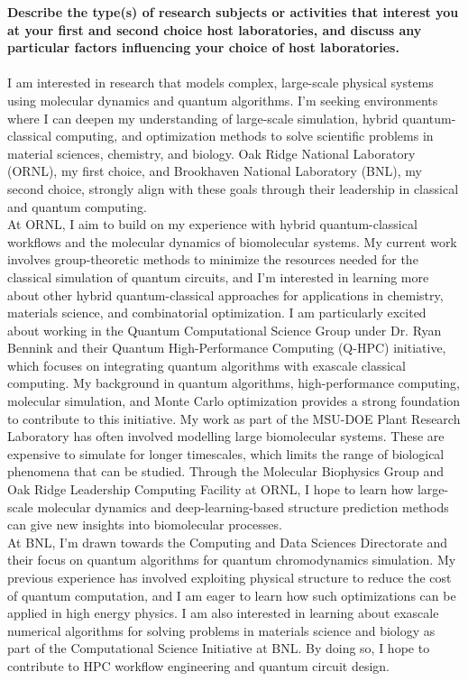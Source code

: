 \documentclass{article}
\begin{document}
\noindent\textbf{Describe the type(s) of research subjects or activities that interest you at your first and second choice host laboratories, and discuss any particular factors influencing your choice of host laboratories.}
\\\\

I am interested in research that models complex, large-scale physical systems using molecular dynamics
and quantum algorithms. I’m seeking environments where I can deepen my understanding of large-scale
simulation, hybrid quantum-classical computing, and optimization methods to solve scientific problems in
material sciences, chemistry, and biology. Oak Ridge National Laboratory (ORNL), my first choice, and Brookhaven National Laboratory (BNL), my second choice, strongly align with these goals through their leadership in classical and quantum computing.
\\

At ORNL, I aim to build on my experience with hybrid quantum-classical workflows and the molecular
dynamics of biomolecular systems. My current work involves group-theoretic methods to minimize the
resources needed for the classical simulation of quantum circuits, and I’m interested in learning more about
other hybrid quantum-classical approaches for applications in chemistry, materials science, and combinatorial
optimization. I am particularly excited about working in the Quantum Computational Science Group under Dr. Ryan
Bennink and their Quantum High-Performance Computing (Q-HPC) initiative, which focuses on integrating
quantum algorithms with exascale classical computing. My background in quantum algorithms, high-performance computing, molecular simulation, and Monte Carlo optimization provides a strong foundation to
contribute to this initiative. My work as part of the MSU-DOE Plant Research Laboratory has often involved modelling large
biomolecular systems. These are expensive to simulate for longer timescales, which limits the range of
biological phenomena that can be studied. Through the Molecular Biophysics Group and Oak Ridge Leadership Computing Facility at ORNL, I hope to learn how large-scale molecular dynamics and deep-learning-based structure prediction methods can give new insights into biomolecular processes.
\\

At BNL, I’m drawn towards the Computing and Data Sciences Directorate and their focus on quantum
algorithms for quantum chromodynamics simulation. My previous experience has involved exploiting physical
structure to reduce the cost of quantum computation, and I am eager to learn how such
optimizations can be applied in high energy physics. I am also interested in learning about exascale numerical
algorithms for solving problems in materials science and biology as part of the Computational Science Initiative
at BNL. By doing so, I hope to contribute to HPC workflow engineering and quantum circuit design.
\end{document}
